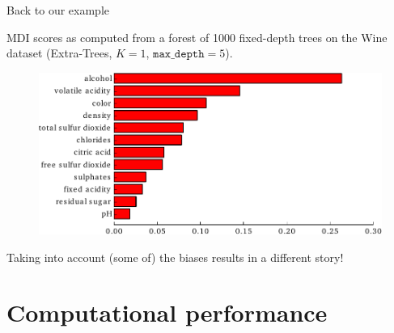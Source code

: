 \documentclass{beamer}
\begin{document}
\begin{frame}{Back to our example}

MDI scores as computed from a forest of 1000 fixed-depth trees on the  Wine
dataset (Extra-Trees, $K=1$, $\texttt{max\_depth}=5$).

\begin{figure}
    \includegraphics[scale=0.7]{./figures/imp-wine2.pdf}
\end{figure}

\begin{center}
Taking into account (some of) the biases results in a different story!
\end{center}

\end{frame}



\section{Computational performance}
\end{document}
